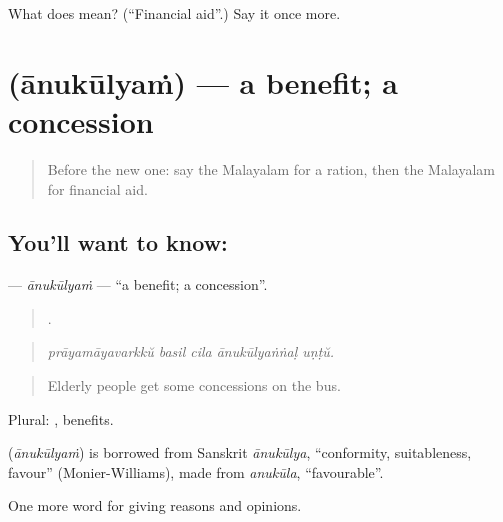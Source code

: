 \begin{tcolorbox}[breakable,colback=teal!4,colframe=teal!35!black,title={Before you move on}]
What does  mean? (\textquotedblleft{}Financial aid\textquotedblright{}.) Say it once more.
\end{tcolorbox}
\section[\texorpdfstring{\ml{ആനുകൂല്യം} (ānukūlyaṁ)}{ആനുകൂല്യം (ānukūlyaṁ)}]{ (ānukūlyaṁ) — a benefit; a concession}

\label{lesson:ML-C429-anukulyam}



\begin{quote}
Before the new one: say the Malayalam for a ration, then the Malayalam for financial aid.
\end{quote}

\subsection*{You'll want to know: }
\textbf{} — \emph{ānukūlyaṁ} — \textquotedblleft{}a benefit; a concession\textquotedblright{}.

\begin{quote}
    .
\end{quote}

\begin{quote}
\emph{prāyamāyavarkkŭ basil cila ānukūlyaṅṅaḷ uṇṭŭ.}
\end{quote}

\begin{quote}
Elderly people get some concessions on the bus.
\end{quote}

Plural: , benefits.

\begin{cousinweb}
\textbf{} (\emph{ānukūlyaṁ}) is borrowed from Sanskrit \emph{ānukūlya}, \textquotedblleft{}conformity, suitableness, favour\textquotedblright{} (Monier-Williams), made from \emph{anukūla}, \textquotedblleft{}favourable\textquotedblright{}.
\end{cousinweb}

\begin{grammarlens}[title={What you've built}]
One more word for giving reasons and opinions.
\end{grammarlens}

